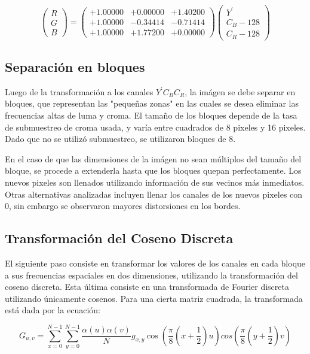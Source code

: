 \documentclass[%
	final,
	reprint,
	notitlepage,
	narroweqnarray,
	inline,
	twoside,
	invited
	]{ieee}
\begin{document}
\[
 \begin{pmatrix} R \\ G \\ B \end{pmatrix} = \begin{pmatrix} +1.00000 & +0.00000 & +1.40200 \\
+1.00000 & -0.34414 & -0.71414 \\
+1.00000& +1.77200 & +0.00000  \end{pmatrix}  \begin{pmatrix}Y^{'} \\ C_B - 128\\ C_R - 128\end{pmatrix}
\]


\subsection{Separación en bloques}

\par Luego de la transformación a los canales $Y^{'}C_BC_R$, la imágen se debe separar en bloques, que representan 
las "pequeñas zonas" en las cuales se desea eliminar las frecuencias altas de luma y croma. El tamaño de los bloques 
depende de la tasa de submuestreo de croma usada, y varía entre cuadrados de 8 pixeles y 16 pixeles. Dado que 
no se utilizó submuestreo, se utilizaron bloques de 8.
\par En el caso de que las dimensiones de la imágen no sean múltiplos del tamaño del bloque, se procede a extenderla 
hasta que los bloques quepan perfectamente. Los nuevos pixeles son llenados utilizando información de sus vecinos más 
inmediatos. Otras alternativas analizadas incluyen llenar los canales de los nuevos pixeles con 0, sin embargo se observaron 
mayores distorsiones en los bordes.

\subsection{Transformación del Coseno Discreta}

El siguiente paso consiste en transformar los valores de los canales en cada bloque a sus 
frecuencias espaciales en dos dimensiones, 
utilizando la transformación del coseno discreta. Esta última consiste en una transformada 
de Fourier discreta utilizando únicamente cosenos. Para una cierta matriz cuadrada, la transformada está 
dada por la ecuación:

\begin{equation}
	G_{u, v} = \sum^{N-1}_{x=0}\sum^{N-1}_{y=0}\frac{\alpha(u)\alpha(v)}{N}g_{x, y}\cos(\frac{\pi}{8}(x+\frac{1}{2})u)cos(\frac{\pi}{8}(y+\frac{1}{2})v)
\end{equation}
\end{document}
